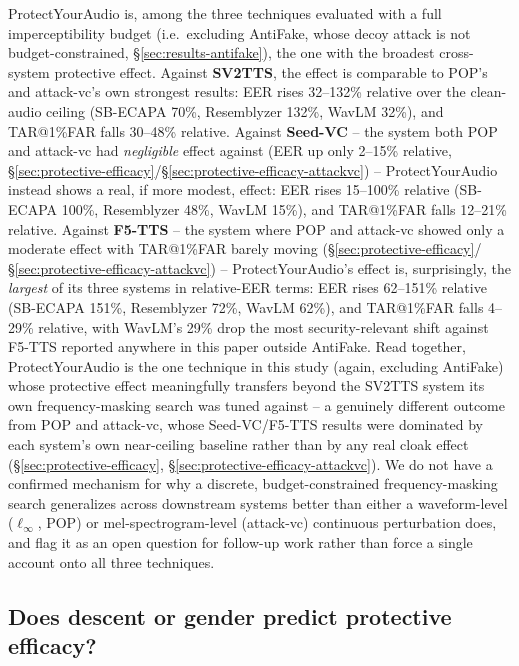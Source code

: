 \documentclass[11pt]{article}
\begin{document}
ProtectYourAudio is, among the three techniques evaluated with a full
imperceptibility budget (i.e.\ excluding AntiFake, whose decoy attack
is not budget-constrained, \S\ref{sec:results-antifake}), the one with
the broadest cross-system protective effect. Against \textbf{SV2TTS},
the effect is comparable to POP's and attack-vc's own strongest
results: EER rises 32--132\% relative over the clean-audio ceiling
(SB-ECAPA 70\%, Resemblyzer 132\%, WavLM 32\%), and TAR@1\%FAR falls
30--48\% relative. Against \textbf{Seed-VC} -- the system both POP and
attack-vc had \emph{negligible} effect against (EER up only 2--15\%
relative, \S\ref{sec:protective-efficacy}/\S\ref{sec:protective-efficacy-attackvc})
-- ProtectYourAudio instead shows a real, if more modest, effect: EER
rises 15--100\% relative (SB-ECAPA 100\%, Resemblyzer 48\%, WavLM
15\%), and TAR@1\%FAR falls 12--21\% relative. Against \textbf{F5-TTS}
-- the system where POP and attack-vc showed only a moderate effect
with TAR@1\%FAR barely moving
(\S\ref{sec:protective-efficacy}/\S\ref{sec:protective-efficacy-attackvc})
-- ProtectYourAudio's effect is, surprisingly, the \emph{largest} of
its three systems in relative-EER terms: EER rises 62--151\% relative
(SB-ECAPA 151\%, Resemblyzer 72\%, WavLM 62\%), and TAR@1\%FAR falls
4--29\% relative, with WavLM's 29\% drop the most security-relevant
shift against F5-TTS reported anywhere in this paper outside AntiFake.
Read together, ProtectYourAudio is the one technique in this study
(again, excluding AntiFake) whose protective effect meaningfully
transfers beyond the SV2TTS system its own frequency-masking search
was tuned against -- a genuinely different outcome from POP and
attack-vc, whose Seed-VC/F5-TTS results were dominated by each
system's own near-ceiling baseline rather than by any real cloak
effect (\S\ref{sec:protective-efficacy}, \S\ref{sec:protective-efficacy-attackvc}).
We do not have a confirmed mechanism for why a discrete,
budget-constrained frequency-masking search generalizes across
downstream systems better than either a waveform-level ($\ell_\infty$,
POP) or mel-spectrogram-level (attack-vc) continuous perturbation
does, and flag it as an open question for follow-up work rather than
force a single account onto all three techniques.

\subsection{Does descent or gender predict protective efficacy?}
\label{sec:protective-efficacy-demographics-protectyouraudio}
\end{document}
